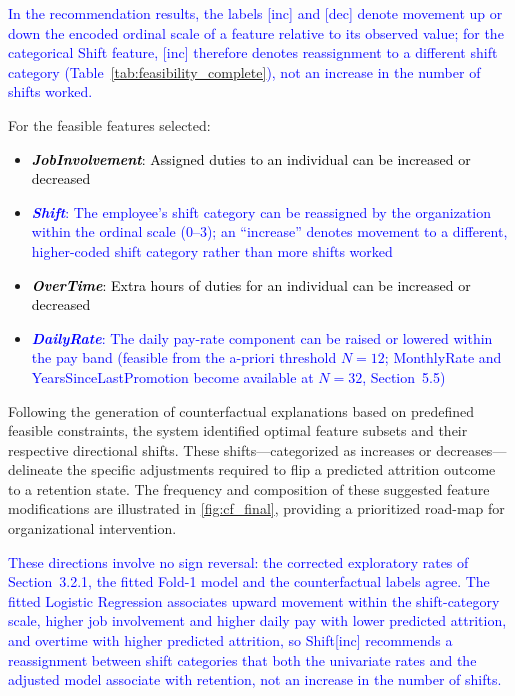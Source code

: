 \documentclass[a4paper,fleqn]{cas-sc}
\begin{document}
\textcolor{blue}{In the recommendation results, the labels [inc] and [dec] denote movement up or down the encoded ordinal scale of a feature relative to its observed value; for the categorical Shift feature, [inc] therefore denotes reassignment to a different shift category (Table~\ref{tab:feasibility_complete}), not an increase in the number of shifts worked.}

For the feasible features selected:
\begin{itemize}
    \item \textcolor{black}{\textit{\textbf{JobInvolvement}}: Assigned duties to an individual can be increased or decreased}
    \item \textcolor{blue}{\textit{\textbf{Shift}}: The employee's shift category can be reassigned by the organization within the ordinal scale (0--3); an ``increase'' denotes movement to a different, higher-coded shift category rather than more shifts worked}
    \item \textcolor{black}{\textit{\textbf{OverTime}}: Extra hours of duties for an individual can be increased or decreased}
    \item \textcolor{blue}{\textit{\textbf{DailyRate}}: The daily pay-rate component can be raised or lowered within the pay band (feasible from the a-priori threshold $N = 12$; MonthlyRate and YearsSinceLastPromotion become available at $N = 32$, Section~5.5)}
\end{itemize}

Following the generation of counterfactual explanations based on predefined feasible constraints, the system identified optimal feature subsets and their respective directional shifts. These shifts—categorized as increases or decreases—delineate the specific adjustments required to flip a predicted attrition outcome to a retention state. The frequency and composition of these suggested feature modifications are illustrated in \cref{fig:cf_final}, providing a prioritized road-map for organizational intervention.

\textcolor{blue}{These directions involve no sign reversal: the corrected exploratory rates of Section~3.2.1, the fitted Fold-1 model and the counterfactual labels agree. The fitted Logistic Regression associates upward movement within the shift-category scale, higher job involvement and higher daily pay with lower predicted attrition, and overtime with higher predicted attrition, so Shift[inc] recommends a reassignment between shift categories that both the univariate rates and the adjusted model associate with retention, not an increase in the number of shifts.}
\end{document}
